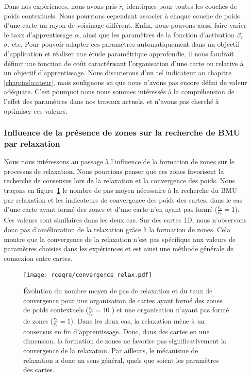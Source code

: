 \documentclass[../main]{subfiles}
\begin{document}
Dans nos expériences, nous avons pris $r_c$ identiques pour toutes les couches de poids contextuels.
Nous pourrions cependant associer à chaque couche de poids d'une carte un rayon de voisinage différent. 
Enfin, nous pouvons aussi faire varier le taux d'apprentissage $\alpha$, ainsi que les paramètres de la fonction d'activation $\beta$, $\sigma$, etc.
Pour pouvoir adapter ces paramètres automatiquement dans un objectif d'application et réaliser une étude paramétrique approfondie, il nous faudrait définir une fonction de coût caractérisant l'organisation d'une carte ou relative à un objectif d'apprentissage. 
Nous discuterons d'un tel indicateur au chapitre \ref{chap:indicateur}, mais soulignons ici que nous n'avons pas encore défini de valeur adéquate. C'est pourquoi nous nous sommes intéressés à la compréhension de l'effet des paramètres dans nos travaux actuels, et n'avons pas cherché à optimiser ces valeurs.


\subsubsection{Influence de la présence de zones sur la recherche de BMU par relaxation}

Nous nous intéressons au passage à l'influence de la formation de zones sur le processus de relaxation.
Nous pourrions penser que ces zones favorisent la recherche de consensus lors de la relaxation et la convergence des poids.
Nous traçons en figure~\ref{fig:conv_rcre} le nombre de pas moyen nécessaire à la recherche du BMU par relaxation et les indicateurs de convergence des poids des cartes, dans le cas d'une carte ayant formé des zones et d'une carte n'en ayant pas formé ($\frac{r_e}{r_c} = 1$). 
Ces valeurs sont similaires dans les deux cas.
Sur des cartes 1D, nous n'observons donc pas d'amélioration de la relaxation grâce à la formation de zones.
Cela montre que la convergence de la relaxation n'est pas spécifique aux valeurs de paramètres choisies dans les expériences et est ainsi une méthode générale de connexion entre cartes.

\begin{figure}[hb]
	\centering\texttt{[image: rceqre/convergence\_relax.pdf]}
	\caption{\'Evolution du nombre moyen de pas de relaxation et du taux de convergence pour une organisation de cartes ayant formé des zones de poids contextuels ($\frac{r_e}{r_c} = 10$ ) et une organisation n'ayant pas formé de zones ($\frac{r_e}{r_c} = 1$). Dans les deux cas, la relaxation mène à un consensus en fin d'apprentissage.
	Donc, dans des cartes en une dimension, la formation de zones ne favorise pas significativement la convergence de la relaxation. Par ailleurs, le mécanisme de relaxation a donc un sens général, quels que soient les paramètres des cartes. \label{fig:conv_rcre}}
\end{figure}
\end{document}
